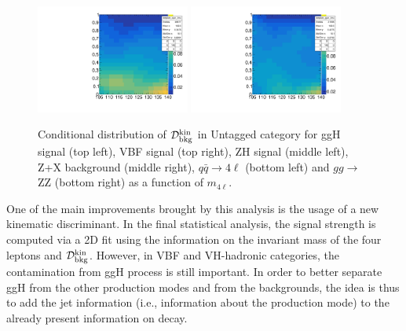 \begin{figure}[!htb]
\begin{center}
\includegraphics[width=0.45\textwidth]{Figures/Observables/qqzz_4mu2018template.pdf}%
\includegraphics[width=0.45\textwidth]{Figures/Observables/ggzz_4mu2018template.pdf}%
\caption{
Conditional distribution of $\mathcal{D}^{\rm kin}_{\rm bkg}$ in Untagged category for ggH signal (top left), VBF signal (top right), ZH signal (middle left), Z+X background (middle right), $q\bar{q}\to 4\ell$ (bottom left) and $gg\to$ZZ (bottom right) as a function of $m_{4\ell}$.
\label{fig:dbkgkin}}
\end{center}
\end{figure}

One of the main improvements brought by this analysis is the usage of a new kinematic discriminant. In the final statistical analysis, the signal strength is computed via a 2D fit using the information on the invariant mass of the four leptons and $\mathcal{D}^{\rm kin}_{\rm bkg} $. However, in VBF and VH-hadronic categories, the contamination from ggH process is still important. In order to better separate ggH from the other production modes and from the backgrounds, the idea is thus to add the jet information (i.e., information about the production mode) to the already present information on decay. 

